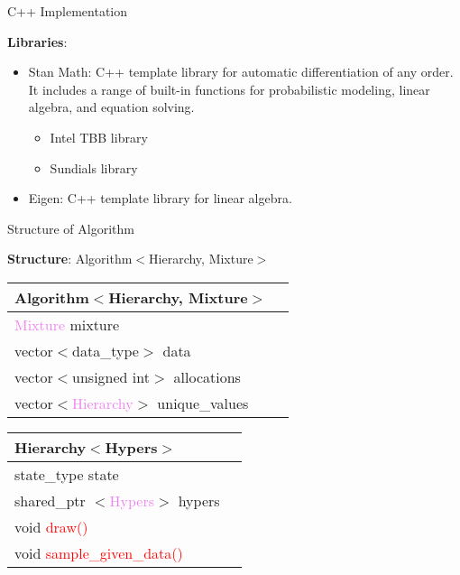 \begin{frame}{C++ Implementation}

\textbf{Libraries}:
\begin{itemize}
		\item Stan Math: C++ template library for automatic differentiation of any order. It includes a range of built-in functions for probabilistic modeling, linear algebra, and equation solving.
		\begin{itemize}
			\item Intel TBB library
			\item  Sundials library
		\end{itemize}
		\item Eigen: C++ template library for linear algebra.
		
\end{itemize}
\end{frame}

\begin{frame}{Structure of Algorithm}

\textbf{Structure}:
 Algorithm$<$Hierarchy, Mixture$>$
\begin{center}
\begin{tabular}{ | l | c| } 
\hline
 Algorithm$<$Hierarchy, Mixture$>$ \\
\hline
 \textcolor{violet}{Mixture} mixture\\
 vector$<$data\_type$>$ data  \\ 
 vector$<$unsigned int$>$ allocations  \\
 vector$<$\textcolor{violet}{Hierarchy}$>$ unique\_values \\
\hline
\end{tabular}
\end{center}



\begin{center}
\begin{tabular}{ | l | c| } 
\hline
Hierarchy$<$Hypers$>$ \\
\hline
 state\_type state  \\ 
 shared\_ptr $<$\textcolor{violet}{Hypers}$>$ hypers \\
 void \textcolor{red}{draw()} \\
 void \textcolor{red}{sample\_given\_data()} \\
\hline
\end{tabular}
\end{center}

	
\end{frame}



